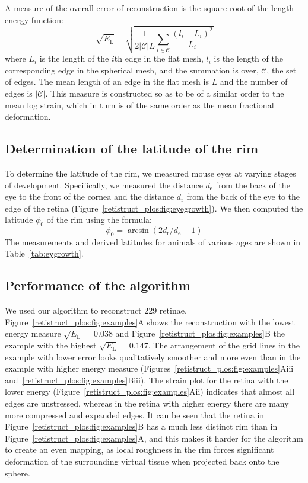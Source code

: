 \documentclass[10pt]{article}
\begin{document}
A measure of the overall error of reconstruction is the square root
of the length energy function:
\begin{equation} 
  \sqrt{E_\mathrm{L}} = \sqrt{\frac{1}{2|\mathcal{C}|\overline{L}}
  \sum_{i\in\mathcal{C}} \frac{(l_i - L_i)^2}{L_i}}
\end{equation} 
where $L_i$ is the length of the $i$th edge in the flat mesh, $l_i$ is
the length of the corresponding edge in the spherical mesh, and the
summation is over, $\mathcal{C}$, the set of edges. The mean length of
an edge in the flat mesh is $\overline{L}$ and the number of edges is
$|\mathcal{C}|$. This measure is constructed so as to be of a similar
order to the mean log strain, which in turn is of the same order as
the mean fractional deformation.  

\subsection*{Determination of the latitude of the rim}
\label{retistruct_plos:sec:determ-latt-rim}

To determine the latitude of the rim, we measured mouse eyes at
varying stages of development. Specifically, we measured the distance
$d_\mathrm{e}$ from the back of the eye to the front of the cornea and
the distance $d_\mathrm{r}$ from the back of the eye to the edge of
the retina (Figure~\ref{retistruct_plos:fig:eyegrowth}). We then
computed the latitude $\phi_0$ of the rim using the formula:
\begin{equation}
  \label{retistruct_plos:eq:4}
  \phi_0 = \arcsin (2d_\mathrm{r}/d_\mathrm{e}-1)
\end{equation}
The measurements and derived latitudes for animals of various ages
are shown in Table~\ref{tab:eygrowth}.

\subsection*{Performance of the algorithm}
\label{retistruct_plos:sec:perf-algor}

We used our algorithm to reconstruct 229 retinae. 
Figure~\ref{retistruct_plos:fig:examples}A shows the reconstruction
with the lowest energy measure $\sqrt{E_\mathrm{L}}=0.038$ and
Figure~\ref{retistruct_plos:fig:examples}B the example with the
highest $\sqrt{E_\mathrm{L}}=0.147$. The arrangement of the grid lines
in the example with lower error looks qualitatively smoother and more
even than in the example with higher energy measure
(Figures~\ref{retistruct_plos:fig:examples}Aiii
and~\ref{retistruct_plos:fig:examples}Biii). The strain plot for the
retina with the lower energy
(Figure~\ref{retistruct_plos:fig:examples}Aii) indicates that almost
all edges are unstressed, whereas in the retina with higher energy
there are many more compressed and expanded edges. It can be seen that
the retina in Figure~\ref{retistruct_plos:fig:examples}B has a much
less distinct rim than in Figure~\ref{retistruct_plos:fig:examples}A,
and this makes it harder for the algorithm to create an even mapping,
as local roughness in the rim forces significant deformation of the
surrounding virtual tissue when projected back onto the sphere.
\end{document}
